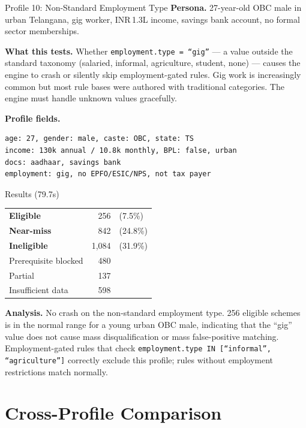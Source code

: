 \documentclass[11pt,a4paper]{article}
\newcommand{\rupee}{INR\,}
\newcommand{\ic}[1]{\texttt{\color{accent}#1}}
\begin{document}
\begin{profilebox}{Profile 10: Non-Standard Employment Type}
\textbf{Persona.} 27-year-old OBC male in urban Telangana, gig worker, \rupee 1.3L income, savings bank account, no formal sector memberships.

\textbf{What this tests.} Whether \ic{employment.type = ``gig''} --- a value outside the standard taxonomy (salaried, informal, agriculture, student, none) --- causes the engine to crash or silently skip employment-gated rules. Gig work is increasingly common but most rule bases were authored with traditional categories. The engine must handle unknown values gracefully.

\textbf{Profile fields.}
\begin{lstlisting}
age: 27, gender: male, caste: OBC, state: TS
income: 130k annual / 10.8k monthly, BPL: false, urban
docs: aadhaar, savings bank
employment: gig, no EPFO/ESIC/NPS, not tax payer
\end{lstlisting}

\begin{resultbox}{Results (79.7s)}
\begin{tabular}{@{}lrl@{}}
  \textcolor{eligible}{\textbf{Eligible}} & 256 & (7.5\%) \\
  \textcolor{nearmiss}{\textbf{Near-miss}} & 842 & (24.8\%) \\
  \textcolor{inelig}{\textbf{Ineligible}} & 1{,}084 & (31.9\%) \\
  Prerequisite blocked & 480 & \\
  Partial & 137 & \\
  Insufficient data & 598 & \\
\end{tabular}
\end{resultbox}

\textbf{Analysis.} No crash on the non-standard employment type. 256 eligible schemes is in the normal range for a young urban OBC male, indicating that the ``gig'' value does not cause mass disqualification or mass false-positive matching. Employment-gated rules that check \ic{employment.type IN [``informal'', ``agriculture'']} correctly exclude this profile; rules without employment restrictions match normally.
\end{profilebox}


\section{Cross-Profile Comparison}
\end{document}
